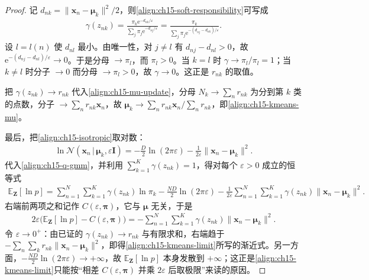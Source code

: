 \documentclass[../../main.tex]{subfiles}
\begin{document}
\begin{proof}
记 $d_{nk}=\|\bm{x}_n-\bm{\mu}_k\|^{2}/2$，则\eqref{align:ch15-soft-responsibility}可写成
\begin{align*}
\gamma(z_{nk})=\frac{\pi_k\mathrm{e}^{-d_{nk}/\varepsilon}}{\sum_j\pi_j\mathrm{e}^{-d_{nj}/\varepsilon}}
=\frac{\pi_k}{\sum_j\pi_j\mathrm{e}^{-(d_{nj}-d_{nk})/\varepsilon}}.
\end{align*}
设 $l=l(n)$ 使 $d_{nl}$ 最小。由唯一性，对 $j\neq l$ 有 $d_{nj}-d_{nl}>0$，故 $\mathrm{e}^{-(d_{nj}-d_{nl})/\varepsilon}\to0$。于是分母 $\to\pi_l$，而 $\pi_l>0$。当 $k=l$ 时 $\gamma\to\pi_l/\pi_l=1$；当 $k\neq l$ 时分子 $\to0$ 而分母 $\to\pi_l>0$，故 $\gamma\to0$。这正是 $r_{nk}$ 的取值。

把 $\gamma(z_{nk})\to r_{nk}$ 代入\eqref{align:ch15-mu-update}，分母 $N_k\to\sum_nr_{nk}$ 为分到第 $k$ 类的点数，分子 $\to\sum_nr_{nk}\bm{x}_n$，故 $\bm{\mu}_k\to\sum_nr_{nk}\bm{x}_n/\sum_nr_{nk}$，即\eqref{align:ch15-kmeans-mu}。

最后，把\eqref{align:ch15-isotropic}取对数：
\begin{align*}
\ln\mathcal{N}(\bm{x}_n\,|\,\bm{\mu}_k,\varepsilon\bm{I})=-\frac{D}{2}\ln(2\pi\varepsilon)-\frac{1}{2\varepsilon}\|\bm{x}_n-\bm{\mu}_k\|^{2}.
\end{align*}
代入\eqref{align:ch15-q-gmm}，并利用 $\sum_{k=1}^{K}\gamma(z_{nk})=1$，得对每个 $\varepsilon>0$ 成立的恒等式
\begin{align*}
\mathbb{E}_{\bm{Z}}[\ln p]
=\sum_{n=1}^{N}\sum_{k=1}^{K}\gamma(z_{nk})\ln\pi_k-\frac{ND}{2}\ln(2\pi\varepsilon)-\frac{1}{2\varepsilon}\sum_{n=1}^{N}\sum_{k=1}^{K}\gamma(z_{nk})\|\bm{x}_n-\bm{\mu}_k\|^{2}.
\end{align*}
右端前两项之和记作 $C(\varepsilon,\bm{\pi})$，它与 $\bm{\mu}$ 无关，于是
\begin{align*}
2\varepsilon\big(\mathbb{E}_{\bm{Z}}[\ln p]-C(\varepsilon,\bm{\pi})\big)=-\sum_{n=1}^{N}\sum_{k=1}^{K}\gamma(z_{nk})\|\bm{x}_n-\bm{\mu}_k\|^{2}.
\end{align*}
令 $\varepsilon\to0^{+}$：由已证的 $\gamma(z_{nk})\to r_{nk}$ 与有限求和，右端趋于 $-\sum_{n}\sum_{k}r_{nk}\|\bm{x}_n-\bm{\mu}_k\|^{2}$，即得\eqref{align:ch15-kmeans-limit}所写的渐近式。另一方面，$-\frac{ND}{2}\ln(2\pi\varepsilon)\to+\infty$，故 $\mathbb{E}_{\bm{Z}}[\ln p]$ 本身发散到 $+\infty$；这正是\eqref{align:ch15-kmeans-limit}只能按“相差 $C(\varepsilon,\bm{\pi})$ 并乘 $2\varepsilon$ 后取极限”来读的原因。
\end{proof}
\end{document}
